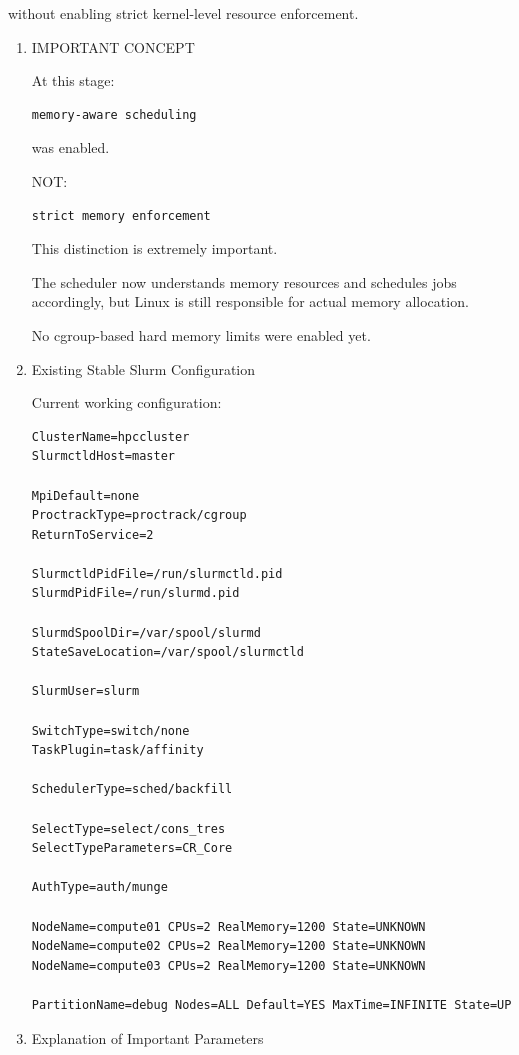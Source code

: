 \documentclass[11pt]{article}
\begin{document}
without enabling strict kernel-level resource enforcement.
\begin{enumerate}
\item IMPORTANT CONCEPT
\label{sec:orgd29771a}

At this stage:

\begin{verbatim}
memory-aware scheduling
\end{verbatim}

was enabled.

NOT:

\begin{verbatim}
strict memory enforcement
\end{verbatim}

This distinction is extremely important.

The scheduler now understands memory resources and schedules jobs
accordingly, but Linux is still responsible for actual memory allocation.

No cgroup-based hard memory limits were enabled yet.
\item Existing Stable Slurm Configuration
\label{sec:orgf34bd18}

Current working configuration:

\begin{verbatim}
ClusterName=hpccluster
SlurmctldHost=master

MpiDefault=none
ProctrackType=proctrack/cgroup
ReturnToService=2

SlurmctldPidFile=/run/slurmctld.pid
SlurmdPidFile=/run/slurmd.pid

SlurmdSpoolDir=/var/spool/slurmd
StateSaveLocation=/var/spool/slurmctld

SlurmUser=slurm

SwitchType=switch/none
TaskPlugin=task/affinity

SchedulerType=sched/backfill

SelectType=select/cons_tres
SelectTypeParameters=CR_Core

AuthType=auth/munge

NodeName=compute01 CPUs=2 RealMemory=1200 State=UNKNOWN
NodeName=compute02 CPUs=2 RealMemory=1200 State=UNKNOWN
NodeName=compute03 CPUs=2 RealMemory=1200 State=UNKNOWN

PartitionName=debug Nodes=ALL Default=YES MaxTime=INFINITE State=UP
\end{verbatim}
\item Explanation of Important Parameters
\label{sec:org7ee4001}


\end{enumerate}
\end{document}
